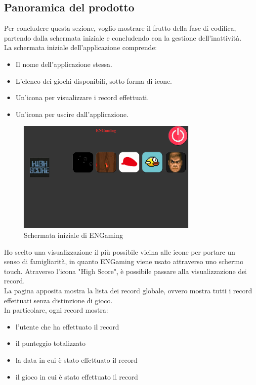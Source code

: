 \subsection{Panoramica del prodotto}
Per concludere questa sezione, voglio mostrare il frutto della fase di codifica, partendo dalla schermata iniziale e concludendo con la gestione dell'inattività.\\
La schermata iniziale dell'applicazione comprende:
\begin{itemize}
    \item Il nome dell'applicazione stessa.
    \item L'elenco dei giochi disponibili, sotto forma di icone.
    \item Un'icona per visualizzare i record effettuati.
    \item Un'icona per uscire dall'applicazione.
\end{itemize}
\begin{figure}[h]
    \centering
    \includegraphics[width=250pt]{images/product/schermataIniziale.png}
    \caption{Schermata iniziale di ENGaming}
    \label{fig:schermataIniziale}
\end{figure}
Ho scelto una visualizzazione il più possibile vicina alle icone per portare un senso di famigliarità, in quanto ENGaming viene usato attraverso uno schermo touch.
\newpage
Atraverso l'icona "High Score", è possibile passare alla visualizzazione dei record.\\
La pagina apposita mostra la lista dei record globale, ovvero mostra tutti i record effettuati senza distinzione di gioco.\\
In particolare, ogni record mostra:
\begin{itemize}
    \item l'utente che ha effettuato il record
    \item il punteggio totalizzato
    \item la data in cui è stato effettuato il record
    \item il gioco in cui è stato effettuato il record
\end{itemize}
